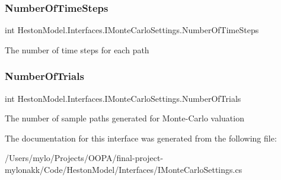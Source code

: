 \subsubsection{\texorpdfstring{Number\+Of\+Time\+Steps}{NumberOfTimeSteps}}
{\footnotesize\ttfamily int Heston\+Model.\+Interfaces.\+I\+Monte\+Carlo\+Settings.\+Number\+Of\+Time\+Steps\hspace{0.3cm}{\ttfamily [get]}}



The number of time steps for each path 

\mbox{\label{interface_heston_model_1_1_interfaces_1_1_i_monte_carlo_settings_a6ba7b3898087faa80b0ab6ef1ec974d3}} 
\subsubsection{\texorpdfstring{Number\+Of\+Trials}{NumberOfTrials}}
{\footnotesize\ttfamily int Heston\+Model.\+Interfaces.\+I\+Monte\+Carlo\+Settings.\+Number\+Of\+Trials\hspace{0.3cm}{\ttfamily [get]}}



The number of sample paths generated for Monte-\/\+Carlo valuation 



The documentation for this interface was generated from the following file\+:\begin{DoxyCompactItemize}
\item 
/\+Users/mylo/\+Projects/\+O\+O\+P\+A/final-\/project-\/mylonakk/\+Code/\+Heston\+Model/\+Interfaces/I\+Monte\+Carlo\+Settings.\+cs\end{DoxyCompactItemize}
